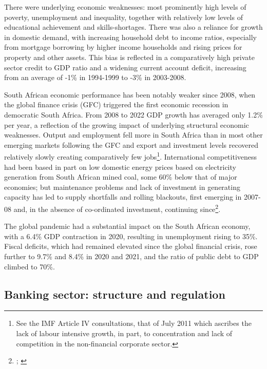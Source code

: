 \documentclass[
]{article}
\begin{document}
There were underlying economic weaknesses: most prominently high levels of poverty, unemployment and inequality, together with relatively low levels of educational achievement and skills-shortages. There was also a reliance for growth in domestic demand, with increasing household debt to income ratios, especially from mortgage borrowing by higher income households and rising prices for property and other assets. This bias is reflected in a comparatively high private sector credit to GDP ratio and a widening current account deficit, increasing from an average of -1\% in 1994-1999 to -3\% in 2003-2008.

South African economic performance has been notably weaker since 2008, when the global finance crisis (GFC) triggered the first economic recession in democratic South Africa. From 2008 to 2022 GDP growth has averaged only 1.2\% per year, a reflection of the growing impact of underlying structural economic weaknesses. Output and employment fell more in South Africa than in most other emerging markets following the GFC and export and investment levels recovered relatively slowly creating comparatively few jobs\footnote{See the IMF Article IV consultations, that of July 2011 which ascribes the lack of labour intensive growth, in part, to concentration and lack of competition in the non-financial corporate sector.}. International competitiveness had been based in part on low domestic energy prices based on electricity generation from South African mined coal, some 60\% below that of major economies; but maintenance problems and lack of investment in generating capacity has led to supply shortfalls and rolling blackouts, first emerging in 2007-08 and, in the absence of co-ordinated investment, continuing since\footnote{\citet{ateba2019strategic}; \citet{folly2021competition}}.

The global pandemic had a substantial impact on the South African economy, with a 6.4\% GDP contraction in 2020, resulting in unemployment rising to 35\%. Fiscal deficits, which had remained elevated since the global financial crisis, rose further to 9.7\% and 8.4\% in 2020 and 2021, and the ratio of public debt to GDP climbed to 70\%.

\hypertarget{banking-sector-structure-and-regulation}{%
\subsection{Banking sector: structure and regulation}\label{banking-sector-structure-and-regulation}}
\end{document}
